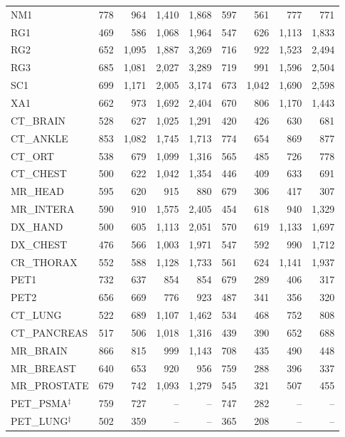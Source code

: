 \documentclass[journal]{IEEEtran}
\begin{document}
\begin{table}[htbp]
\begin{tabular}{l|rrrr|rrrr}
NM1                  & 778 & 964 & 1{,}410 & 1{,}868 & 597 & 561 & 777 & 771 \\
RG1                  & 469 & 586 & 1{,}068 & 1{,}964 & 547 & 626 & 1{,}113 & 1{,}833 \\
RG2                  & 652 & 1{,}095 & 1{,}887 & 3{,}269 & 716 & 922 & 1{,}523 & 2{,}494 \\
RG3                  & 685 & 1{,}081 & 2{,}027 & 3{,}289 & 719 & 991 & 1{,}596 & 2{,}504 \\
SC1                  & 699 & 1{,}171 & 2{,}005 & 3{,}174 & 673 & 1{,}042 & 1{,}690 & 2{,}598 \\
XA1                  & 662 & 973 & 1{,}692 & 2{,}404 & 670 & 806 & 1{,}170 & 1{,}443 \\
CT\_BRAIN            & 528 & 627 & 1{,}025 & 1{,}291 & 420 & 426 & 630 & 681 \\
CT\_ANKLE            & 853 & 1{,}082 & 1{,}745 & 1{,}713 & 774 & 654 & 869 & 877 \\
CT\_ORT              & 538 & 679 & 1{,}099 & 1{,}316 & 565 & 485 & 726 & 778 \\
CT\_CHEST            & 500 & 622 & 1{,}042 & 1{,}354 & 446 & 409 & 633 & 691 \\
MR\_HEAD             & 595 & 620 & 915 & 880 & 679 & 306 & 417 & 307 \\
MR\_INTERA           & 590 & 910 & 1{,}575 & 2{,}405 & 454 & 618 & 940 & 1{,}329 \\
DX\_HAND             & 500 & 605 & 1{,}113 & 2{,}051 & 570 & 619 & 1{,}133 & 1{,}697 \\
DX\_CHEST            & 476 & 566 & 1{,}003 & 1{,}971 & 547 & 592 & 990 & 1{,}712 \\
CR\_THORAX           & 552 & 588 & 1{,}128 & 1{,}733 & 561 & 624 & 1{,}141 & 1{,}937 \\
PET1                 & 732 & 637 & 854 & 854 & 679 & 289 & 406 & 317 \\
PET2                 & 656 & 669 & 776 & 923 & 487 & 341 & 356 & 320 \\
CT\_LUNG             & 522 & 689 & 1{,}107 & 1{,}462 & 534 & 468 & 752 & 808 \\
CT\_PANCREAS         & 517 & 506 & 1{,}018 & 1{,}316 & 439 & 390 & 652 & 688 \\
MR\_BRAIN            & 866 & 815 & 999 & 1{,}143 & 708 & 435 & 490 & 448 \\
MR\_BREAST           & 640 & 653 & 920 & 956 & 759 & 288 & 396 & 337 \\
MR\_PROSTATE         & 679 & 742 & 1{,}093 & 1{,}279 & 545 & 321 & 507 & 455 \\
PET\_PSMA$^\ddagger$ & 759 & 727 & -- & -- & 747 & 282 & -- & -- \\
PET\_LUNG$^\ddagger$ & 502 & 359 & -- & -- & 365 & 208 & -- & -- \\
\bottomrule
\end{tabular}


\end{table}
\end{document}

